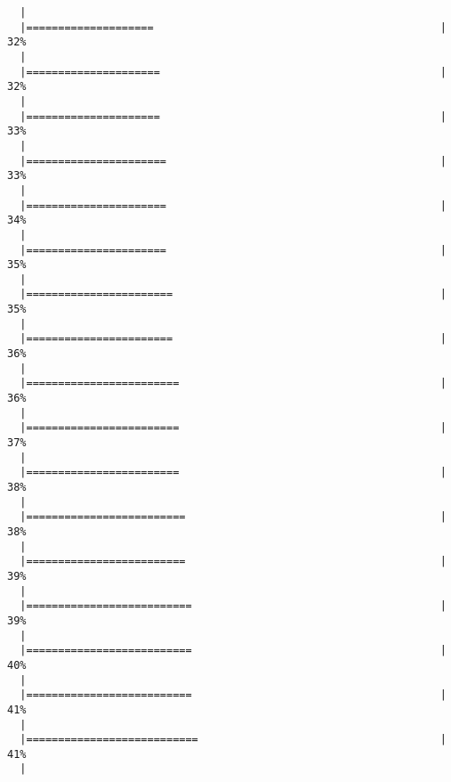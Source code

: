 \documentclass[]{article}
\begin{document}
\begin{verbatim}
  |                                                                       
  |====================                                             |  32%
  |                                                                       
  |=====================                                            |  32%
  |                                                                       
  |=====================                                            |  33%
  |                                                                       
  |======================                                           |  33%
  |                                                                       
  |======================                                           |  34%
  |                                                                       
  |======================                                           |  35%
  |                                                                       
  |=======================                                          |  35%
  |                                                                       
  |=======================                                          |  36%
  |                                                                       
  |========================                                         |  36%
  |                                                                       
  |========================                                         |  37%
  |                                                                       
  |========================                                         |  38%
  |                                                                       
  |=========================                                        |  38%
  |                                                                       
  |=========================                                        |  39%
  |                                                                       
  |==========================                                       |  39%
  |                                                                       
  |==========================                                       |  40%
  |                                                                       
  |==========================                                       |  41%
  |                                                                       
  |===========================                                      |  41%
  |                                                                       

\end{verbatim}
\end{document}

